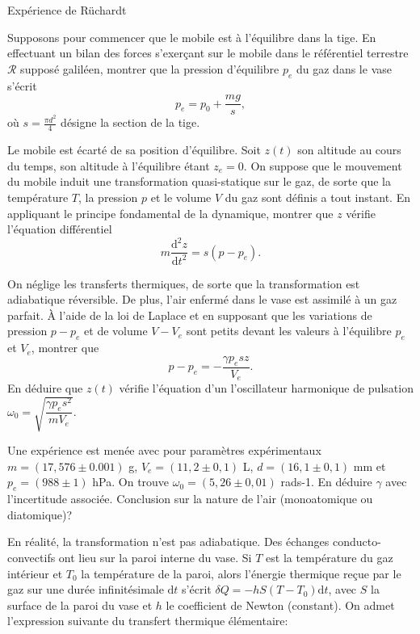 \begin{exo}[PC][2]{Expérience de Rüchardt}
\begin{quest}
\item Supposons pour commencer que le mobile est à l'équilibre dans la tige. En effectuant un bilan des forces s'exerçant sur le mobile dans le référentiel terrestre $\mathcal{R}$ supposé galiléen, montrer que la pression d'équilibre $p_e$ du gaz dans le vase s'écrit
\begin{equation}
p_e = p_0 + \dfrac{mg}{s},
\end{equation}
où $s=\frac{\pi d^2}{4}$ désigne la section de la tige.
\item Le mobile est écarté de sa position d'équilibre. Soit $z(t)$ son altitude au cours du temps, son altitude à l'équilibre étant $z_e=0$. On suppose que le mouvement du mobile induit une transformation quasi-statique sur le gaz, de sorte que la température $T$, la pression $p$ et le volume $V$ du gaz sont définis a tout instant. En appliquant le principe fondamental de la dynamique, montrer que $z$ vérifie l'équation différentiel
\begin{equation}
m\dfrac{\mathrm{d}^2 z}{\mathrm{d} t^2} = s(p-p_e).
\end{equation}
\item On néglige les transferts thermiques, de sorte que la transformation est adiabatique réversible. De plus, l'air enfermé dans le vase est assimilé à un gaz parfait. À l'aide de la loi de Laplace et en supposant que les variations de pression $p-p_e$ et de volume $V-V_e$ sont petits devant les valeurs à l'équilibre $p_e$ et $V_e$, montrer que
\begin{equation}
p-p_e = -\dfrac{\gamma p_e s z}{V_e}.
\end{equation}
En déduire que $z(t)$ vérifie l'équation d'un l'oscillateur harmonique de pulsation $\omega_0 = \sqrt{\dfrac{\gamma p_e s^2}{m V_e}}$.
\item Une expérience est menée avec pour paramètres expérimentaux $m= (17,576 \pm 0.001) $ g, $V_e = (11,2 \pm 0,1)$ L, $d=(16,1 \pm 0,1)$ mm et $p_e = (988 \pm 1)$ hPa. On trouve $\omega_0 = (5,26 \pm 0,01)$ {rad}{}{s}{-1}. En déduire $\gamma$ avec l'incertitude associée. Conclusion sur la nature de l'air (monoatomique ou diatomique)?
\item En réalité, la transformation n'est pas adiabatique. Des échanges conducto-convectifs ont lieu sur la paroi interne du vase. Si $T$ est la température du gaz intérieur et $T_0$ la température de la paroi, alors l'énergie thermique reçue par le gaz sur une durée infinitésimale $\mathrm{d}t$ s'écrit $\delta Q = -hS(T-T_0) \mathrm{d}t$, avec $S$ la surface de la paroi du vase et $h$ le coefficient de Newton (constant). On admet l'expression suivante du transfert thermique élémentaire:

\end{quest}
\end{exo}
